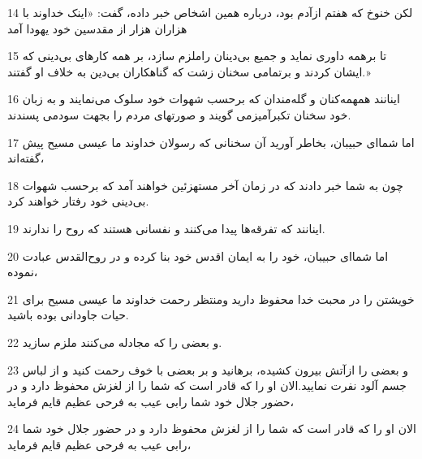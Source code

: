 \par 14 لکن خنوخ که هفتم ازآدم بود، درباره همین اشخاص خبر داده، گفت: «اینک خداوند با هزاران هزار از مقدسین خود یهودا آمد
\par 15 تا برهمه داوری نماید و جمیع بی‌دینان راملزم سازد، بر همه کارهای بی‌دینی که ایشان کردند و برتمامی سخنان زشت که گناهکاران بی‌دین به خلاف او گفتند.»
\par 16 اینانند همهمه‌کنان و گله‌مندان که برحسب شهوات خود سلوک می‌نمایند و به زبان خود سخنان تکبرآمیزمی گویند و صورتهای مردم را بجهت سودمی پسندند.
\par 17 اما شما‌ای حبیبان، بخاطر آورید آن سخنانی که رسولان خداوند ما عیسی مسیح پیش گفته‌اند،
\par 18 چون به شما خبر دادند که در زمان آخر مستهزئین خواهند آمد که برحسب شهوات بی‌دینی خود رفتار خواهند کرد.
\par 19 اینانند که تفرقه‌ها پیدا می‌کنند و نفسانی هستند که روح را ندارند.
\par 20 اما شما‌ای حبیبان، خود را به ایمان اقدس خود بنا کرده و در روح‌القدس عبادت نموده،
\par 21 خویشتن را در محبت خدا محفوظ دارید ومنتظر رحمت خداوند ما عیسی مسیح برای حیات جاودانی بوده باشید.
\par 22 و بعضی را که مجادله می‌کنند ملزم سازید.
\par 23 و بعضی را ازآتش بیرون کشیده، برهانید و بر بعضی با خوف رحمت کنید و از لباس جسم آلود نفرت نمایید.الان او را که قادر است که شما را از لغزش محفوظ دارد و در حضور جلال خود شما رابی عیب به فرحی عظیم قایم فرماید،
\par 24 الان او را که قادر است که شما را از لغزش محفوظ دارد و در حضور جلال خود شما رابی عیب به فرحی عظیم قایم فرماید،


